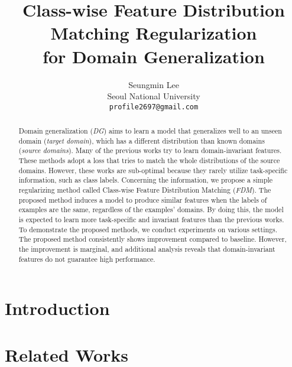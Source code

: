 \documentclass[10pt,twocolumn,letterpaper]{article}
\begin{document}
\title{Class-wise Feature Distribution Matching Regularization\\ for Domain Generalization}

\author{Seungmin Lee\\
Seoul National University\\
{\tt\small profile2697@gmail.com}
}

\maketitle

\begin{abstract}
 Domain generalization (\textit{DG}) aims to learn a model that generalizes well to an unseen domain (\textit{target domain}), which has a different distribution than known domains (\textit{source domains}). Many of the previous works try to learn domain-invariant features. These methods adopt a loss that tries to match the whole distributions of the source domains. However, these works are sub-optimal because they rarely utilize task-specific information, such as class labels. Concerning the information, we propose a simple regularizing method called Class-wise Feature Distribution Matching (\textit{FDM}). The proposed method induces a model to produce similar features when the labels of examples are the same, regardless of the examples' domains. By doing this, the model is expected to learn more task-specific and invariant features than the previous works. To demonstrate the proposed methods, we conduct experiments on various settings. The proposed method consistently shows improvement compared to baseline. However, the improvement is marginal, and additional analysis reveals that domain-invariant features do not guarantee high performance.
\end{abstract}

\section{Introduction}


\section{Related Works}

\end{document}
